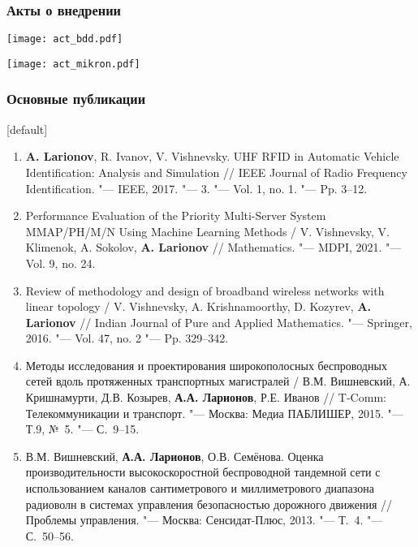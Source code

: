 \begin{frame}
    \frametitle{Акты о внедрении}
    \begin{minipage}[t]{0.49\linewidth}
        \texttt{[image: act\_bdd.pdf]}
    \end{minipage}
    \hfill
    \begin{minipage}[t]{0.49\linewidth}
        \texttt{[image: act\_mikron.pdf]}
    \end{minipage}
\end{frame}

\begin{frame} %
    \frametitle{Основные публикации}
    [default]
    \footnotesize
    \begin{enumerate}
        \item \textbf{A. Larionov}, R. Ivanov, V. Vishnevsky. UHF RFID in Automatic Vehicle Identification: Analysis and Simulation // IEEE Journal of Radio Frequency Identification. "--- IEEE, 2017. "--- 3. "--- Vol. 1, no. 1. "--- Pp. 3--12.
        \item Performance Evaluation of the Priority Multi-Server System MMAP/PH/M/N Using Machine Learning Methods / V. Vishnevsky, V. Klimenok, A. Sokolov, \textbf{A. Larionov} // Mathematics. "--- MDPI, 2021. "--- Vol. 9, no. 24.
        \item Review of methodology and design of broadband wireless networks with linear topology / V. Vishnevsky, A. Krishnamoorthy, D. Kozyrev, \textbf{A. Larionov} // Indian Journal of Pure and Applied Mathematics. "--- Springer, 2016. "--- Vol. 47, no. 2 "--- Pp. 329--342.
        \item Методы исследования и проектирования широкополосных беспроводных сетей вдоль протяженных транспортных магистралей / В.М. Вишневский, А. Кришнамурти, Д.В. Козырев, \textbf{А.А. Ларионов}, Р.Е. Иванов // T-Comm: Телекоммуникации и транспорт. "--- Москва: Медиа ПАБЛИШЕР, 2015. "--- Т.9, №~5. "--- С.~9--15.
        \item В.М. Вишневский, \textbf{А.А. Ларионов}, О.В. Семёнова. Оценка производительности высокоскоростной беспроводной тандемной сети с использованием каналов сантиметрового и миллиметрового диапазона радиоволн в системах управления безопасностью дорожного движения // Проблемы управления. "--- Москва: Сенсидат-Плюс, 2013. "--- Т.~4. "--- С.~50--56.

\end{enumerate}
\end{frame}
